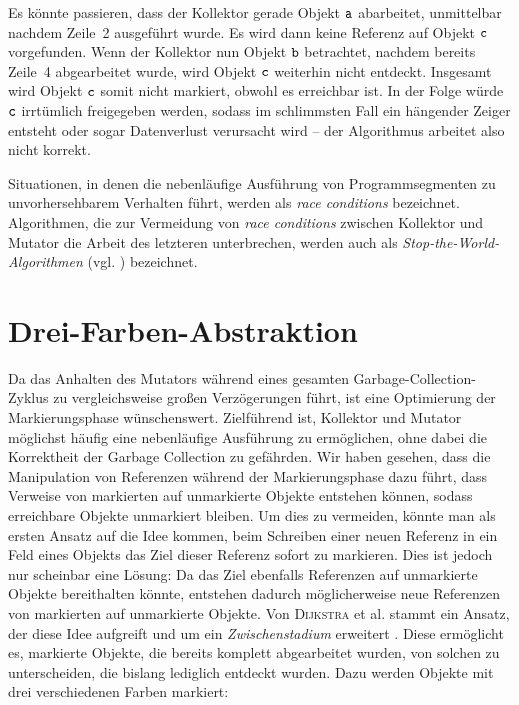 Es könnte passieren, dass der Kollektor gerade Objekt $\texttt{a}$ abarbeitet, unmittelbar nachdem Zeile~2 ausgeführt wurde.
Es wird dann keine Referenz auf Objekt $\texttt{c}$ vorgefunden.
Wenn der Kollektor nun Objekt $\texttt{b}$ betrachtet, nachdem bereits Zeile~4 abgearbeitet wurde, wird Objekt $\texttt{c}$ weiterhin nicht entdeckt.
Insgesamt wird Objekt $\texttt{c}$ somit nicht markiert, obwohl es erreichbar ist.
In der Folge würde $\texttt{c}$ irrtümlich freigegeben werden, sodass im schlimmsten Fall ein hängender Zeiger entsteht oder sogar Datenverlust verursacht wird -- der Algorithmus arbeitet also nicht korrekt.

Situationen, in denen die nebenläufige Ausführung von Programmsegmenten zu unvorhersehbarem Verhalten führt, werden als \textit{race conditions} bezeichnet.
Algorithmen, die zur Vermeidung von \textit{race conditions} zwischen Kollektor und Mutator die Arbeit des letzteren unterbrechen, werden auch als \textit{Stop-the-World-Algorithmen} (vgl. \cite[S. 17]{handbook}) bezeichnet.




\section{Drei-Farben-Abstraktion}
\label{sec:tricolor}
Da das Anhalten des Mutators während eines gesamten Garbage-Collection-Zyklus zu vergleichsweise großen Verzögerungen führt, ist eine Optimierung der Markierungsphase wünschenswert.
Zielführend ist, Kollektor und Mutator möglichst häufig eine nebenläufige Ausführung zu ermöglichen, ohne dabei die Korrektheit der Garbage Collection zu gefährden.
Wir haben gesehen, dass die Manipulation von Referenzen während der Markierungsphase dazu führt, dass Verweise von markierten auf unmarkierte Objekte entstehen können, sodass erreichbare Objekte unmarkiert bleiben.
Um dies zu vermeiden, könnte man als ersten Ansatz auf die Idee kommen, beim Schreiben einer neuen Referenz in ein Feld eines Objekts das Ziel dieser Referenz sofort zu markieren.
Dies ist jedoch nur scheinbar eine Lösung:
Da das Ziel ebenfalls Referenzen auf unmarkierte Objekte bereithalten könnte, entstehen dadurch möglicherweise neue Referenzen von markierten auf unmarkierte Objekte.
Von \textsc{Dijkstra} et al. stammt ein Ansatz, der diese Idee aufgreift und um ein \textit{Zwischenstadium} erweitert \cite[S. 969f]{dijkstra1978}.
Diese ermöglicht es, markierte Objekte, die bereits komplett abgearbeitet wurden, von solchen zu unterscheiden, die bislang lediglich entdeckt wurden.
Dazu werden Objekte mit drei verschiedenen Farben markiert:

